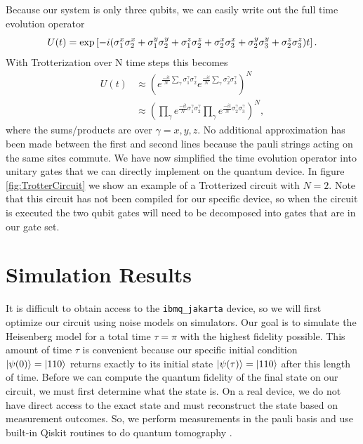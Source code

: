 \documentclass[aps,prl, reprint]{revtex4-2}
\begin{document}
Because our system is only three qubits, we can easily write out the full time evolution operator
\begin{dmath}
U(t) = \exp\left[-i(\sigma_{1}^{x} \sigma_{2}^{x} + \sigma_{1}^{y} \sigma_{2}^{y} + \sigma_{1}^{z} \sigma_{2}^{z} \\
+ \sigma_{2}^{x} \sigma_{3}^{x} + \sigma_{2}^{y} \sigma_{3}^{y} + \sigma_{2}^{z} \sigma_{3}^{z})t\right].
\end{dmath}
With Trotterization over N time steps this becomes
\begin{align*}
U(t) &\approx \left(e^{\frac{-it}{N}\sum_\gamma\sigma_{1}^{\gamma} \sigma_{2}^{\gamma}}e^{\frac{-it}{N}\sum_\gamma\sigma_{2}^{\gamma} \sigma_{3}^{\gamma}}\right)^N\\
&\approx \left(\prod_{\gamma}e^{\frac{-it}{N}\sigma_{1}^{\gamma} \sigma_{2}^{\gamma}}\prod_{\gamma}e^{\frac{-it}{N}\sigma_{2}^{\gamma} \sigma_{3}^{\gamma}}\right)^N,
\end{align*}
where the sums/products are over $\gamma =x,y,z$. No additional approximation has been made between the first and second lines because the pauli strings acting on the same sites commute. We have now simplified the time evolution operator into unitary gates that we can directly implement on the quantum device. In figure \ref{fig:TrotterCircuit} we show an example of a Trotterized circuit with $N=2$. Note that this circuit has not been compiled for our specific device, so when the circuit is executed the two qubit gates will need to be decomposed into gates that are in our gate set.

\section{Simulation Results}

It is difficult to obtain access to the \texttt{ibmq\_jakarta} device, so we will first optimize our circuit using noise models on simulators. Our goal is to simulate the Heisenberg model for a total time $\tau=\pi$ with the highest fidelity possible. This amount of time $\tau$ is convenient because our specific initial condition $\ket{\psi(0)}=\ket{110}$ returns exactly to its initial state $\ket{\psi(\tau)}=\ket{110}$ after this length of time. Before we can compute the quantum fidelity of the final state on our circuit, we must first determine what the state is. On a real device, we do not have direct access to the exact state and must reconstruct the state based on measurement outcomes. So, we perform measurements in the pauli basis and use built-in Qiskit routines to do quantum tomography \cite{Qiskit, smolin2012efficient}.
\end{document}
